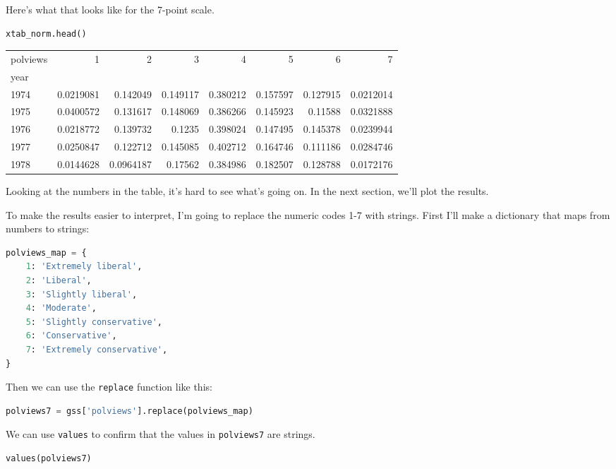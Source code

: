 Here's what that looks like for the 7-point scale.

\begin{lstlisting}[language=Python,style=source]
xtab_norm.head()
\end{lstlisting}

\begin{tabular}{lrrrrrrr}
\toprule
polviews & 1 & 2 & 3 & 4 & 5 & 6 & 7 \\
year &  &  &  &  &  &  &  \\
\midrule
1974 & 0.0219081 & 0.142049 & 0.149117 & 0.380212 & 0.157597 & 0.127915 & 0.0212014 \\
1975 & 0.0400572 & 0.131617 & 0.148069 & 0.386266 & 0.145923 & 0.11588 & 0.0321888 \\
1976 & 0.0218772 & 0.139732 & 0.1235 & 0.398024 & 0.147495 & 0.145378 & 0.0239944 \\
1977 & 0.0250847 & 0.122712 & 0.145085 & 0.402712 & 0.164746 & 0.111186 & 0.0284746 \\
1978 & 0.0144628 & 0.0964187 & 0.17562 & 0.384986 & 0.182507 & 0.128788 & 0.0172176 \\
\bottomrule
\end{tabular}

Looking at the numbers in the table, it's hard to see what's going on.
In the next section, we'll plot the results.

To make the results easier to interpret, I'm going to replace the
numeric codes 1-7 with strings. First I'll make a dictionary that maps
from numbers to strings:

\begin{lstlisting}[language=Python,style=source]
polviews_map = {
    1: 'Extremely liberal',
    2: 'Liberal',
    3: 'Slightly liberal',
    4: 'Moderate',
    5: 'Slightly conservative',
    6: 'Conservative',
    7: 'Extremely conservative',
}
\end{lstlisting}

Then we can use the \passthrough{\lstinline!replace!} function like
this:

\begin{lstlisting}[language=Python,style=source]
polviews7 = gss['polviews'].replace(polviews_map)
\end{lstlisting}

We can use \passthrough{\lstinline!values!} to confirm that the values
in \passthrough{\lstinline!polviews7!} are strings.

\begin{lstlisting}[language=Python,style=source]
values(polviews7)
\end{lstlisting}

